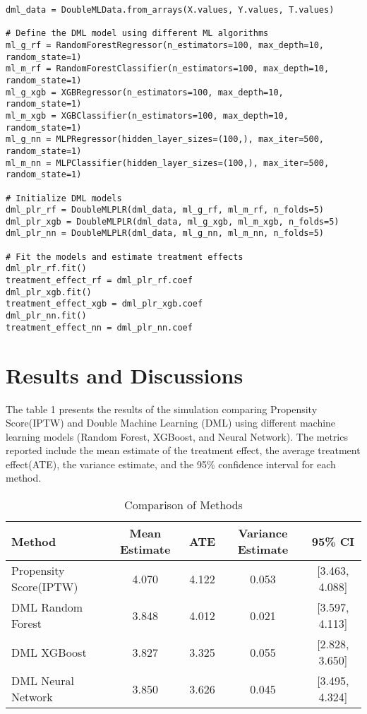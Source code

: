 \documentclass{article}
\begin{document}
\begin{verbatim}
dml_data = DoubleMLData.from_arrays(X.values, Y.values, T.values)

# Define the DML model using different ML algorithms
ml_g_rf = RandomForestRegressor(n_estimators=100, max_depth=10, random_state=1)
ml_m_rf = RandomForestClassifier(n_estimators=100, max_depth=10, random_state=1)
ml_g_xgb = XGBRegressor(n_estimators=100, max_depth=10, random_state=1)
ml_m_xgb = XGBClassifier(n_estimators=100, max_depth=10, random_state=1)
ml_g_nn = MLPRegressor(hidden_layer_sizes=(100,), max_iter=500, random_state=1)
ml_m_nn = MLPClassifier(hidden_layer_sizes=(100,), max_iter=500, random_state=1)

# Initialize DML models
dml_plr_rf = DoubleMLPLR(dml_data, ml_g_rf, ml_m_rf, n_folds=5)
dml_plr_xgb = DoubleMLPLR(dml_data, ml_g_xgb, ml_m_xgb, n_folds=5)
dml_plr_nn = DoubleMLPLR(dml_data, ml_g_nn, ml_m_nn, n_folds=5)

# Fit the models and estimate treatment effects
dml_plr_rf.fit()
treatment_effect_rf = dml_plr_rf.coef
dml_plr_xgb.fit()
treatment_effect_xgb = dml_plr_xgb.coef
dml_plr_nn.fit()
treatment_effect_nn = dml_plr_nn.coef
\end{verbatim}

\newpage
\section{Results and Discussions}
The table 1 presents the results of the simulation comparing Propensity Score(IPTW) and Double Machine Learning (DML) using different machine learning models (Random Forest, XGBoost, and Neural Network). The metrics reported include the mean estimate of the treatment effect, the average treatment effect(ATE), the variance estimate, and the 95\% confidence interval for each method.

\begin{table}[ht]
    \centering
    \begin{tabular}{|l|c|c|c|c|}
        \hline
        \textbf{Method} & \textbf{Mean Estimate} & \textbf{ATE} & \textbf{Variance Estimate} & \textbf{95\% CI} \\
        \hline
        Propensity Score(IPTW) & 4.070 & 4.122 & 0.053 & [3.463, 4.088] \\
        \hline
        DML Random Forest & 3.848 & 4.012 & 0.021 & [3.597, 4.113] \\
        \hline
        DML XGBoost & 3.827 & 3.325 & 0.055 & [2.828, 3.650] \\
        \hline
        DML Neural Network & 3.850 & 3.626 & 0.045 & [3.495, 4.324] \\
        \hline
    \end{tabular}
    \caption{Comparison of Methods}
    \label{tab:comparison}
\end{table}
\end{document}
